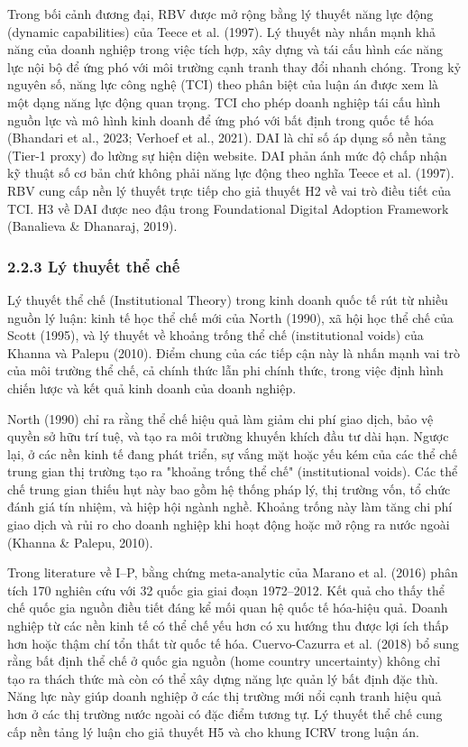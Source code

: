 \documentclass[12pt,a4paper]{article}
\begin{document}
Trong bối cảnh đương đại, RBV được mở rộng bằng lý thuyết năng lực động
(dynamic capabilities) của Teece et al. (1997). Lý thuyết này nhấn mạnh
khả năng của doanh nghiệp trong việc tích hợp, xây dựng và tái cấu hình
các năng lực nội bộ để ứng phó với môi trường cạnh tranh thay đổi nhanh
chóng. Trong kỷ nguyên số, năng lực công nghệ (TCI) theo phân biệt của
luận án được xem là một dạng năng lực động quan trọng. TCI cho phép
doanh nghiệp tái cấu hình nguồn lực và mô hình kinh doanh để ứng phó với
bất định trong quốc tế hóa (Bhandari et al., 2023; Verhoef et al.,
2021). DAI là chỉ số áp dụng số nền tảng (Tier-1 proxy) đo lường sự hiện
diện website. DAI phản ánh mức độ chấp nhận kỹ thuật số cơ bản chứ không
phải năng lực động theo nghĩa Teece et al. (1997). RBV cung cấp nền lý
thuyết trực tiếp cho giả thuyết H2 về vai trò điều tiết của TCI. H3 về
DAI được neo đậu trong Foundational Digital Adoption Framework
(Banalieva \& Dhanaraj, 2019).

\hypertarget{223-luxfd-thuyux1ebft-thux1ec3-chux1ebf}{%
\subsubsection{2.2.3 Lý thuyết thể
chế}\label{223-luxfd-thuyux1ebft-thux1ec3-chux1ebf}}

Lý thuyết thể chế (Institutional Theory) trong kinh doanh quốc tế rút từ
nhiều nguồn lý luận: kinh tế học thể chế mới của North (1990), xã hội
học thể chế của Scott (1995), và lý thuyết về khoảng trống thể chế
(institutional voids) của Khanna và Palepu (2010). Điểm chung của các
tiếp cận này là nhấn mạnh vai trò của môi trường thể chế, cả chính thức
lẫn phi chính thức, trong việc định hình chiến lược và kết quả kinh
doanh của doanh nghiệp.

North (1990) chỉ ra rằng thể chế hiệu quả làm giảm chi phí giao dịch,
bảo vệ quyền sở hữu trí tuệ, và tạo ra môi trường khuyến khích đầu tư
dài hạn. Ngược lại, ở các nền kinh tế đang phát triển, sự vắng mặt hoặc
yếu kém của các thể chế trung gian thị trường tạo ra "khoảng trống thể
chế" (institutional voids). Các thể chế trung gian thiếu hụt này bao gồm
hệ thống pháp lý, thị trường vốn, tổ chức đánh giá tín nhiệm, và hiệp
hội ngành nghề. Khoảng trống này làm tăng chi phí giao dịch và rủi ro
cho doanh nghiệp khi hoạt động hoặc mở rộng ra nước ngoài (Khanna \&
Palepu, 2010).

Trong literature về I--P, bằng chứng meta-analytic của Marano et al.
(2016) phân tích 170 nghiên cứu với 32 quốc gia giai đoạn 1972--2012.
Kết quả cho thấy thể chế quốc gia nguồn điều tiết đáng kể mối quan hệ
quốc tế hóa-hiệu quả. Doanh nghiệp từ các nền kinh tế có thể chế yếu hơn
có xu hướng thu được lợi ích thấp hơn hoặc thậm chí tổn thất từ quốc tế
hóa. Cuervo-Cazurra et al. (2018) bổ sung rằng bất định thể chế ở quốc
gia nguồn (home country uncertainty) không chỉ tạo ra thách thức mà còn
có thể xây dựng năng lực quản lý bất định đặc thù. Năng lực này giúp
doanh nghiệp ở các thị trường mới nổi cạnh tranh hiệu quả hơn ở các thị
trường nước ngoài có đặc điểm tương tự. Lý thuyết thể chế cung cấp nền
tảng lý luận cho giả thuyết H5 và cho khung ICRV trong luận án.
\end{document}
